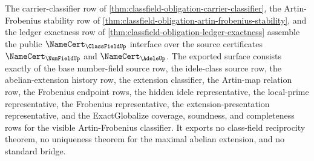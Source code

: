 \begin{theorem}
\label{thm:classfield-public-namecert-interface}
The carrier-classifier row of \autoref{thm:classfield-obligation-carrier-classifier}, the Artin-Frobenius stability row of \autoref{thm:classfield-obligation-artin-frobenius-stability}, and the ledger exactness row of \autoref{thm:classfield-obligation-ledger-exactness} assemble the public $\NameCert_{\ClassFieldUp}$ interface over the source certificates $\NameCert_{\NumFieldUp}$ and $\NameCert_{\AdeleUp}$. The exported surface consists exactly of the base number-field source row, the idele-class source row, the abelian-extension history row, the extension classifier, the Artin-map relation row, the Frobenius endpoint rows, the hidden idele representative, the local-prime representative, the Frobenius representative, the extension-presentation representative, and the ExactGlobalize coverage, soundness, and completeness rows for the visible Artin-Frobenius classifier. It exports no class-field reciprocity theorem, no uniqueness theorem for the maximal abelian extension, and no standard bridge.
\end{theorem}
